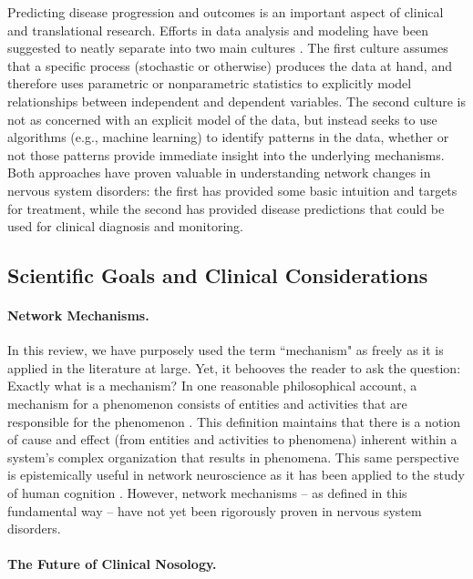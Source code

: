 \documentclass[12pt]{article}
\begin{document}
Predicting disease progression and outcomes is an important aspect of clinical and translational research. Efforts in data analysis and modeling have been suggested to neatly separate into two main cultures \cite{breiman2001statistical}. The first culture assumes that a specific process (stochastic or otherwise) produces the data at hand, and therefore uses parametric or nonparametric statistics to explicitly model relationships between independent and dependent variables. The second culture is not as concerned with an explicit model of the data, but instead seeks to use algorithms (e.g., machine learning) to identify patterns in the data, whether or not those patterns provide immediate insight into the underlying mechanisms. Both approaches have proven valuable in understanding network changes in nervous system disorders: the first has provided some basic intuition and targets for treatment, while the second has provided disease predictions that could be used for clinical diagnosis and monitoring. 

\subsection*{Scientific Goals and Clinical Considerations}

\paragraph{Network Mechanisms.}

In this review, we have purposely used the term ``mechanism" as freely as it is applied in the literature at large. Yet, it behooves the reader to ask the question: Exactly what is a mechanism? In one reasonable philosophical account, a mechanism for a phenomenon consists of entities and activities that are responsible for the phenomenon \cite{Illari2012}. This definition maintains that there is a notion of cause and effect (from entities and activities to phenomena) inherent within a system's complex organization that results in phenomena. This same perspective is epistemically useful in network neuroscience as it has been applied to the study of human cognition \cite{medaglia2015cognitive}. However, network mechanisms -- as defined in this fundamental way -- have not yet been rigorously proven in nervous system disorders. 

\paragraph{The Future of Clinical Nosology.}
\end{document}
